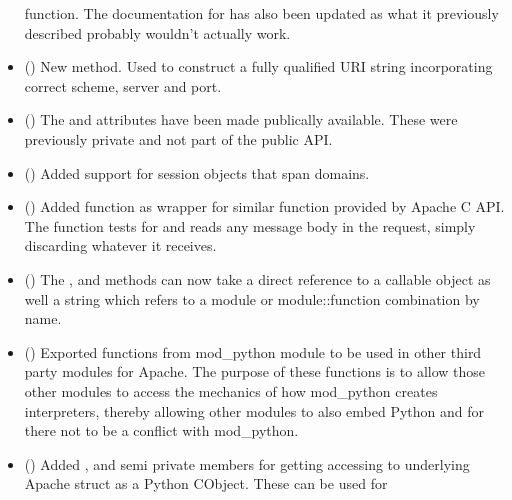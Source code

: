 \begin{itemize}
       function. The documentation for
       has also been updated as what it
      previously described probably wouldn't actually work.
    \item
      ()
      New  method. Used to construct a fully
      qualified URI string incorporating correct scheme, server and port.
    \item
      ()
      The  and  attributes
      have been made publically available. These were previously private and
      not part of the public API.
    \item
      ()
      Added support for session objects that span domains.
    \item
      ()
      Added  function as wrapper for
      similar function provided by Apache C API. The function tests for
      and reads any message body in the request, simply discarding
      whatever it receives.
    \item
      ()
      The ,  and
       methods can now take a direct
      reference to a callable object as well a string which refers to a
      module or module::function combination by name.
    \item
      ()
      Exported functions from mod_python module to be used in other third
      party modules for Apache. The purpose of these functions is to allow
      those other modules to access the mechanics of how mod_python creates
      interpreters, thereby allowing other modules to also embed Python
      and for there not to be a conflict with mod_python.
    \item
      ()
      Added ,  and
       semi private members for getting accessing to
      underlying Apache struct as a Python CObject. These can be used for

\end{itemize}
